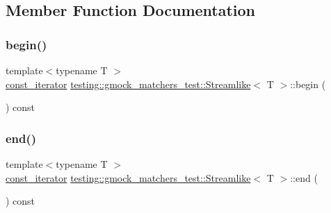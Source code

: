 \subsection{Member Function Documentation}
\mbox{\label{classtesting_1_1gmock__matchers__test_1_1_streamlike_a1ac125e14fd2358cdb727e0044ef7f01}} 
\subsubsection{\texorpdfstring{begin()}{begin()}}
{\footnotesize\ttfamily template$<$typename T $>$ \\
\mbox{\hyperlink{classtesting_1_1gmock__matchers__test_1_1_streamlike_a2eeb61dca56f70d0266f5f8ae91d2c7b}{const\+\_\+iterator}} \mbox{\hyperlink{classtesting_1_1gmock__matchers__test_1_1_streamlike}{testing\+::gmock\+\_\+matchers\+\_\+test\+::\+Streamlike}}$<$ T $>$\+::begin (\begin{DoxyParamCaption}{ }\end{DoxyParamCaption}) const\hspace{0.3cm}{\ttfamily [inline]}}

\mbox{\label{classtesting_1_1gmock__matchers__test_1_1_streamlike_a3e3aa6924974abcf7855dab1094bd860}} 
\subsubsection{\texorpdfstring{end()}{end()}}
{\footnotesize\ttfamily template$<$typename T $>$ \\
\mbox{\hyperlink{classtesting_1_1gmock__matchers__test_1_1_streamlike_a2eeb61dca56f70d0266f5f8ae91d2c7b}{const\+\_\+iterator}} \mbox{\hyperlink{classtesting_1_1gmock__matchers__test_1_1_streamlike}{testing\+::gmock\+\_\+matchers\+\_\+test\+::\+Streamlike}}$<$ T $>$\+::end (\begin{DoxyParamCaption}{ }\end{DoxyParamCaption}) const\hspace{0.3cm}{\ttfamily [inline]}}




